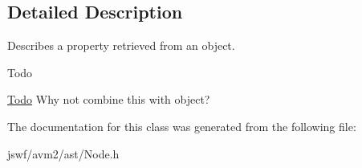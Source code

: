 \subsection{Detailed Description}
Describes a property retrieved from an object. 

\begin{DoxyRefDesc}{Todo}
\item[\hyperlink{todo__todo000002}{Todo}]Why not combine this with object? \end{DoxyRefDesc}


The documentation for this class was generated from the following file\+:\begin{DoxyCompactItemize}
\item 
jswf/avm2/ast/Node.\+h\end{DoxyCompactItemize}
